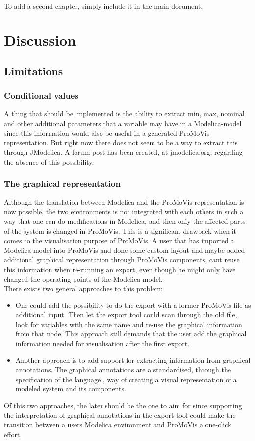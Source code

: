 To add a second chapter, simply include it in the main document.

\section{Discussion}
\subsection{Limitations}


\subsubsection{Conditional values}
A thing that should be implemented is the ability to extract min, max, nominal and other additional parameters that a variable may have in a Modelica-model since this information would also be useful in a generated ProMoVis-representation. But right now there does not seem to be a way to extract this through JModelica. A forum post has been created, at jmodelica.org, regarding the absence of this possibility.
\subsubsection{The graphical representation}
Although the translation between Modelica and the ProMoVis-representation is now possible, the two environments is not integrated with each others in such a way that one can do modifications in Modelica, and then only the affected parts of the system is changed in ProMoVis. This is a significant drawback when it comes to the visualisation purpose of ProMoVis. A user that has imported a Modelica model into ProMoVis and done some custom layout and maybe added additional graphical representation through ProMoVis components, cant reuse this information when re-running an export, even though he might only have changed the operating points of the Modelica model.\\\newline There exists two general approaches to this problem: 
\begin{itemize}
\item One could add the possibility to do the export with a former ProMoVis-file as additional input. Then let the export tool could scan through the old file, look for variables with the same name and re-use the graphical information from that node. This approach still demands that the user add the graphical information needed for visualisation after the first export.
\item Another approach is to add support for extracting information from graphical annotations. The graphical annotations are a standardised, through the specification of the language \cite{ModelicaSpec}\nocite{*}, way of creating a visual representation of a modeled system and its components.
\end{itemize}Of this two approaches, the later should be the one to aim for since supporting the interpretation of graphical annotations in the export-tool could make the transition between a users Modelica environment and ProMoVis a one-click effort. 


